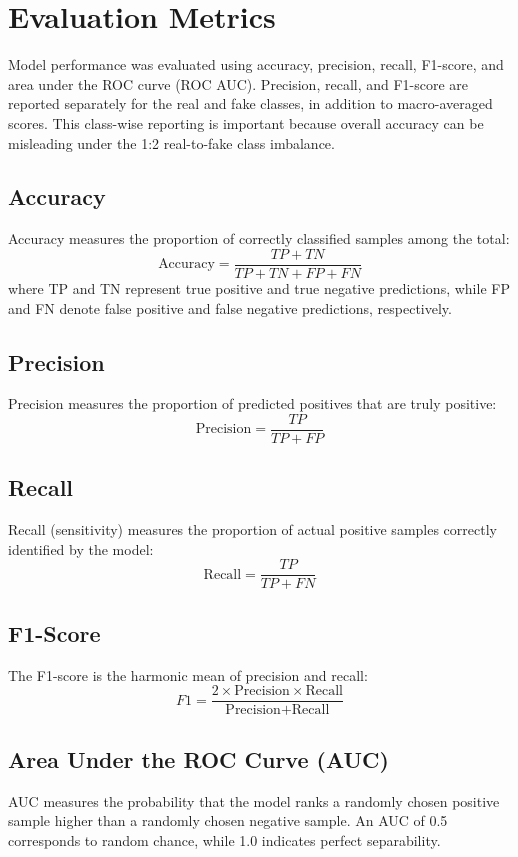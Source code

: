 \section{Evaluation Metrics}
\label{sec:evaluation-metrics}

Model performance was evaluated using accuracy, precision, recall, F1-score, and area under the ROC curve (ROC AUC). Precision, recall, and F1-score are reported separately for the real and fake classes, in addition to macro-averaged scores. This class-wise reporting is important because overall accuracy can be misleading under the 1:2 real-to-fake class imbalance.

\subsection{Accuracy}
\label{subsec:accuracy}
Accuracy measures the proportion of correctly classified samples among the total:
\begin{equation}
\text{Accuracy} = \frac{TP + TN}{TP + TN + FP + FN}
\end{equation}
where TP and TN represent true positive and true negative predictions, while FP and FN denote false positive and false negative predictions, respectively.

\subsection{Precision}
\label{subsec:precision}
Precision measures the proportion of predicted positives that are truly positive:
\begin{equation}
\text{Precision} = \frac{TP}{TP + FP}
\end{equation}

\subsection{Recall}
\label{subsec:recall}
Recall (sensitivity) measures the proportion of actual positive samples correctly identified by the model:
\begin{equation}
\text{Recall} = \frac{TP}{TP + FN}
\end{equation}

\subsection{F1-Score}
\label{subsec:f1-score}
The F1-score is the harmonic mean of precision and recall:
\begin{equation}
F1 = \frac{2 \times \text{Precision} \times \text{Recall}}{\text{Precision} + \text{Recall}}
\end{equation}

\subsection{Area Under the ROC Curve (AUC)}
\label{subsec:auc}
AUC measures the probability that the model ranks a randomly chosen positive sample higher than a randomly chosen negative sample. An AUC of 0.5 corresponds to random chance, while 1.0 indicates perfect separability.
